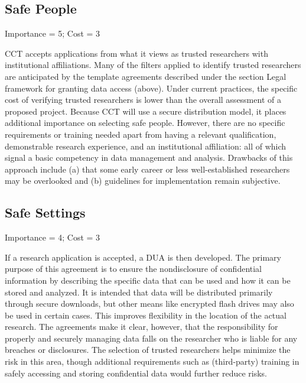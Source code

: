 \hypertarget{safe-people-5}{%
\subsection{Safe People}\label{safe-people-5}}

Importance = 5; Cost = 3

CCT accepts applications from what it views as trusted researchers with institutional affiliations. Many of the filters applied to identify trusted researchers are anticipated by the template agreements described under the section Legal framework for granting data access (above). Under current practices, the specific cost of verifying trusted researchers is lower than the overall assessment of a proposed project. Because CCT will use a secure distribution model, it places additional importance on selecting safe people. However, there are no specific requirements or training needed apart from having a relevant qualification, demonstrable research experience, and an institutional affiliation: all of which signal a basic competency in data management and analysis. Drawbacks of this approach include (a) that some early career or less well-established researchers may be overlooked and (b) guidelines for implementation remain subjective.

\hypertarget{safe-settings-5}{%
\subsection{Safe Settings}\label{safe-settings-5}}

Importance = 4; Cost = 3

If a research application is accepted, a DUA is then developed. The primary purpose of this agreement is to ensure the nondisclosure of confidential information by describing the specific data that can be used and how it can be stored and analyzed. It is intended that data will be distributed primarily through secure downloads, but other means like encrypted flash drives may also be used in certain cases. This improves flexibility in the location of the actual research. The agreements make it clear, however, that the responsibility for properly and securely managing data falls on the researcher who is liable for any breaches or disclosures. The selection of trusted researchers helps minimize the risk in this area, though additional requirements such as (third-party) training in safely accessing and storing confidential data would further reduce risks.

